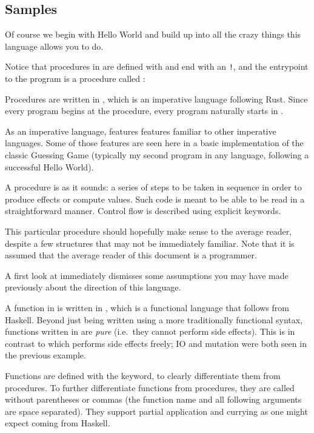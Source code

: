 \subsection{Samples}

Of course we begin with Hello World and build up into all the crazy things this
language allows you to do.

Notice that procedures in \Trilogy{} are defined with  and end with an
\texttt{!}, and the entrypoint to the program is a procedure called :


Procedures are written in \Prose{}, which is an imperative language following Rust.
Since every program begins at the  procedure, every program naturally starts
in \Prose{}.

As an imperative language, \Prose{} features features familiar to other imperative
languages. Some of those features are seen here in a basic implementation of the
classic Guessing Game (typically my second program in any language, following a
successful Hello World).


A procedure is as it sounds: a series of steps to be taken in sequence in order
to produce effects or compute values. Such code is meant to be able to be read
in a straightforward manner. Control flow is described using explicit keywords.

This particular procedure should hopefully make sense to the average reader,
despite a few structures that may not be immediately familiar. Note that it is
assumed that the average reader of this document is a programmer.

A first look at \Poetry{} immediately dismisses some assumptions you may have
made previously about the direction of this language.


A function in \Trilogy{} is written in \Poetry{}, which is a functional
language that follows from Haskell. Beyond just being written using a more
traditionally functional syntax, functions written in \Poetry{} are \emph{pure}
(i.e.\ they cannot perform side effects). This is in contrast to \Prose{} which
performs side effects freely; IO and mutation were both seen in the previous
example.

Functions are defined with the  keyword, to clearly differentiate them
from procedures. To further differentiate functions from procedures, they are called
without parentheses or commas (the function name and all following arguments are space
separated). They support partial application and currying as one might expect coming
from Haskell.

